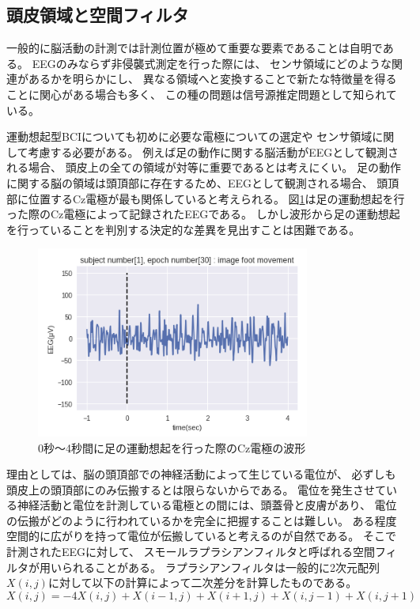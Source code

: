\subsection{\mc 頭皮領域と空間フィルタ}
一般的に脳活動の計測では計測位置が極めて重要な要素であることは自明である。
EEGのみならず非侵襲式測定を行った際には、
センサ領域にどのような関連があるかを明らかにし、
異なる領域へと変換することで新たな特徴量を得ることに関心がある場合も多く、
この種の問題は信号源推定問題として知られている。

運動想起型BCIについても初めに必要な電極についての選定や
センサ領域に関して考慮する必要がある。
例えば足の動作に関する脳活動がEEGとして観測される場合、
頭皮上の全ての領域が対等に重要であるとは考えにくい。
足の動作に関する脳の領域は頭頂部に存在するため、EEGとして観測される場合、
頭頂部に位置するCz電極が最も関係していると考えられる。
図\ref{fig:Cz}は足の運動想起を行った際のCz電極によって記録されたEEGである。
しかし波形から足の運動想起を行っていることを判別する決定的な差異を見出すことは困難である。
\begin{figure}[t]
    \centering
    \includegraphics[width=9cm]{images/CzEEG.png}
    \caption{0秒〜4秒間に足の運動想起を行った際のCz電極の波形}
    \label{fig:Cz}
\end{figure}
理由としては、脳の頭頂部での神経活動によって生じている電位が、
必ずしも頭皮上の頭頂部にのみ伝搬するとは限らないからである。
電位を発生させている神経活動と電位を計測している電極との間には、頭蓋骨と皮膚があり、
電位の伝搬がどのように行われているかを完全に把握することは難しい。
ある程度空間的に広がりを持って電位が伝搬していると考えるのが自然である。
そこで計測されたEEGに対して、
スモールラプラシアンフィルタと呼ばれる空間フィルタが用いられることがある。
ラプラシアンフィルタは一般的に2次元配列\(X(i,j)\)に対して以下の計算によって二次差分を計算したものである。
\begin{equation}
    X(i,j) = -4X(i,j) + X(i-1,j) + X(i+1,j) + X(i,j-1) + X(i,j+1)
\end{equation}
